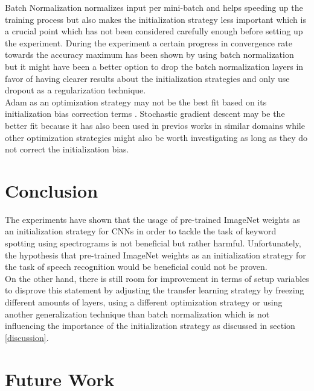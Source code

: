 \documentclass{article}
\theoremstyle{definition}
\theoremstyle{remark}
\begin{document}
Batch Normalization normalizes input per mini-batch and helps speeding up the training process but also makes the initialization strategy less important \cite{ioffe2015batch} which is a crucial point which has not been considered carefully enough before setting up the experiment. During the experiment a certain progress in convergence rate towards the accuracy maximum has been shown by using batch normalization but it might have been a better option to drop the batch normalization layers in favor of having clearer results about the initialization strategies and only use dropout as a regularization technique.\\
Adam as an optimization strategy may not be the best fit based on its initialization bias correction terms \cite{kingma2014adam}. Stochastic gradient descent may be the better fit because it has also been used in previos works in similar domains \cite{gouda2018speech} while other optimization strategies might also be worth investigating as long as they do not correct the initialization bias.




\section{Conclusion}

The experiments have shown that the usage of pre-trained ImageNet weights as an initialization strategy for CNNs in order to tackle the task of keyword spotting using spectrograms is not beneficial but rather harmful. Unfortunately, the hypothesis that pre-trained ImageNet weights as an initialization strategy for the task of speech recognition would be beneficial could not be proven.\\

On the other hand, there is still room for improvement in terms of setup variables to disprove this statement by adjusting the transfer learning strategy by freezing different amounts of layers, using a different optimization strategy or using another generalization technique than batch normalization which is not influencing the importance of the initialization strategy as discussed in section \ref{discussion}.


\section{Future Work} \label{future_work}
\end{document}
